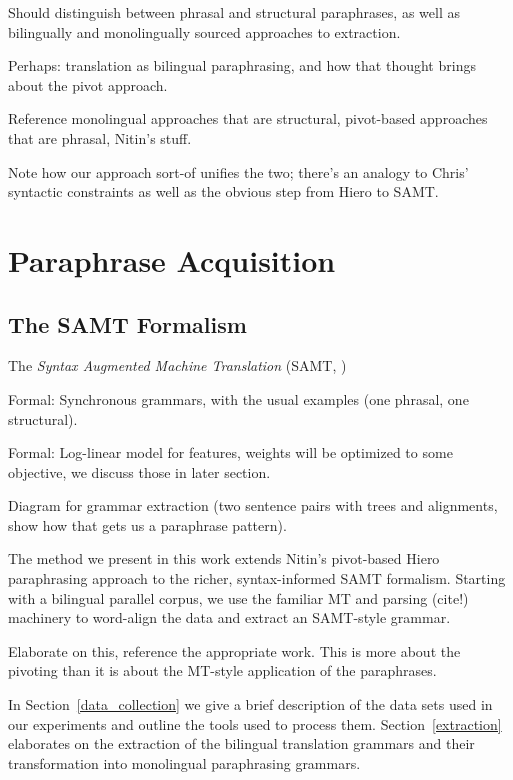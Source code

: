 \documentclass[11pt]{article}
\begin{document}
Should distinguish between phrasal and structural paraphrases, as well
as bilingually and monolingually sourced approaches to extraction.

Perhaps: translation as bilingual paraphrasing, and how that thought
brings about the pivot approach.

Reference monolingual approaches that are structural, pivot-based
approaches that are phrasal, Nitin's stuff.

Note how our approach sort-of unifies the two; there's an analogy to
Chris' syntactic constraints as well as the obvious step from Hiero to
SAMT.

\section{Paraphrase Acquisition} \label{acquisition}



\subsection{The SAMT Formalism}

The \emph{Syntax Augmented Machine Translation} (SAMT,
\cite{Zollmann2006})

Formal: Synchronous grammars, with the usual examples (one phrasal, one
structural).

Formal: Log-linear model for features, weights will be optimized to some
objective, we discuss those in later section.

Diagram for grammar extraction (two sentence pairs with trees and
alignments, show how that gets us a paraphrase pattern). 



The method we present in this work extends Nitin's pivot-based Hiero
paraphrasing approach to the richer, syntax-informed SAMT
formalism. Starting with a bilingual parallel corpus, we use the
familiar MT and parsing (cite!) machinery to word-align the data and
extract an SAMT-style grammar.

Elaborate on this, reference the appropriate work. This is more about
the pivoting than it is about the MT-style application of the
paraphrases.

In Section~\ref{data_collection} we give a brief description of the
data sets used in our experiments and outline the tools used to
process them. Section~\ref{extraction} elaborates on the extraction
of the bilingual translation grammars and their transformation into
monolingual paraphrasing grammars.
\end{document}
